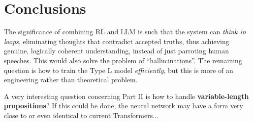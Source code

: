 \documentclass[runningheads]{llncs}
\begin{document}
\section*{Conclusions}

The significance of combining RL and LLM is such that the system can \textit{think in loops}, eliminating thoughts that contradict accepted truths, thus achieving genuine, logically coherent understanding, instead of just parroting human speeches.  This would also solve the problem of ``hallucinations''.  The remaining question is how to train the Type L model \textit{efficiently}, but this is more of an engineering rather than theoretical problem.

A very interesting question concerning Part II is how to handle \textbf{variable-length propositions}?  If this could be done, the neural network may have a form very close to or even identical to current Transformers...

%
%
%
% 
\printbibliography
\end{document}

